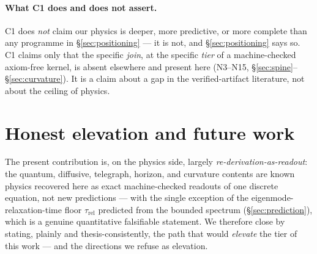 \documentclass[10pt,twocolumn]{article}
\theoremstyle{definition}
\begin{document}
\paragraph{What C1 does and does not assert.} C1 does \emph{not} claim our physics is
deeper, more predictive, or more complete than any programme in \S\ref{sec:positioning} ---
it is not, and \S\ref{sec:positioning} says so. C1 claims only that the specific
\emph{join}, at the specific \emph{tier} of a machine-checked axiom-free kernel, is absent
elsewhere and present here (N3--N15, \S\ref{sec:spine}--\S\ref{sec:curvature}). It is a
claim about a gap in the verified-artifact literature, not about the ceiling of physics.

\section{Honest elevation and future work}\label{sec:elevation}

The present contribution is, on the physics side, largely \emph{re-derivation-as-readout}:
the quantum, diffusive, telegraph, horizon, and curvature contents are known physics
recovered here as exact machine-checked readouts of one discrete equation, not new
predictions --- with the single exception of the eigenmode-relaxation-time floor
$\tau_{\mathrm{rel}}$ predicted from the bounded spectrum (\S\ref{sec:prediction}), which is a genuine
quantitative falsifiable statement. We therefore close by stating, plainly and
thesis-consistently, the path that would \emph{elevate} the tier of this work --- and the
directions we refuse as elevation.
\end{document}
